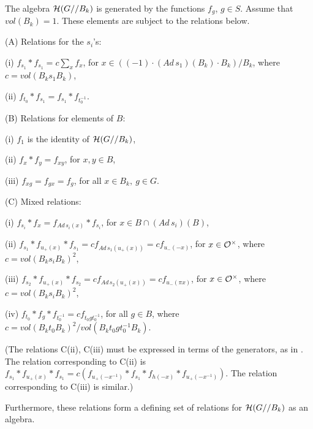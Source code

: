 \begin{proposition} 
\label{prop:main}
The algebra ${\cal H}(G//B_k)$
is generated by the functions $f_g$, $g\in S$.
Assume that $vol(B_k)=1$.
These elements are subject to the relations below.

\noindent
(A) Relations for the $s_i$'s:

(i) $f_{s_1}*f_{s_1}=c\sum_x f_x$, for
$x\in ((-1)\cdot (Ad\, s_1)(B_k)\cdot B_k)/B_k$, where
$c=vol(B_k s_1 B_k)$, 

(ii) $f_{t_0}*f_{s_1}=f_{s_1}*f_{t_0^{-1}}$.

\noindent
(B) Relations for elements of $B$:

(i) $f_1$ is the identity of ${\cal H}(G//B_k)$,

(ii) $f_x*f_y=f_{xy}$, for $x,y\in B$,

(iii) $f_{xg}=f_{gx}=f_g$, for all $x\in B_k,\ g\in G$.

\noindent
(C) Mixed relations:

(i) $f_{s_i}*f_x=f_{Ad\, s_i(x)}*f_{s_i}$, for $x\in B\cap (Ad\, s_i)(B)$,

(ii) $f_{s_1}*f_{u_+(x)}*f_{s_1}=cf_{Ad\, s_1(u_+(x))}=cf_{u_-(-x)}$, for
$x\in {\cal O}^\times$, where $c=vol(B_k s_i B_k)^2$,

(iii) $f_{s_2}*f_{u_+(x)}*f_{s_2}=cf_{Ad\, s_2(u_+(x))}=cf_{u_-(\pi x)}$,
for $x\in {\cal O}^\times$, where $c=vol(B_k s_i B_k)^2$,

(iv) $f_{t_0}*f_g*f_{t_0^{-1}}=cf_{t_0gt_0^{-1}}$,
for all $g\in B$, where $c=vol(B_k t_0 B_k)^2/vol(B_k t_0gt_0^{-1}B_k)$.

\noindent
(The relations C(ii), C(iii) must be expressed in terms of the generators,
as in \cite{H}. The relation corresponding to C(ii) is
$f_{s_1}*f_{u_+(x)}*f_{s_1}
=c(f_{u_+(-x^{-1})}*f_{s_1}*f_{h(-x)}*f_{u_+(-x^{-1})})$.
The relation corresponding to C(iii) is similar.)

Furthermore, these relations form a defining set of relations for
${\cal H}(G//B_k)$ as an algebra.
\end{proposition}

